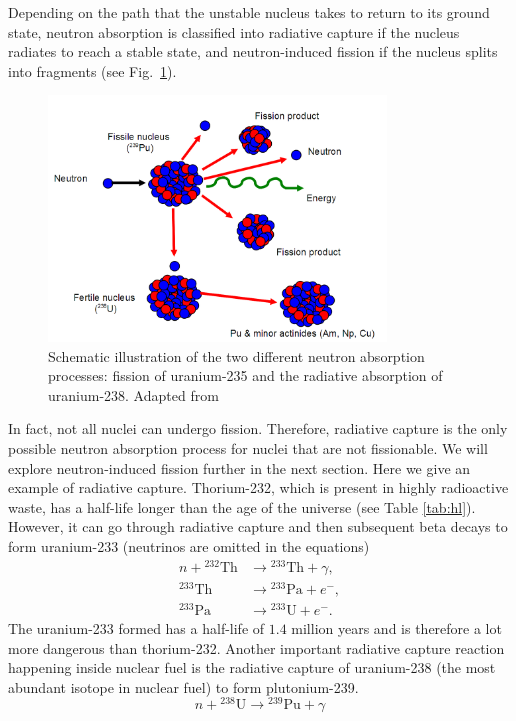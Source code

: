 \documentclass[nofootinbib,preprint,aps]{revtex4-1}
\begin{document}
    Depending on the path that the unstable nucleus takes to return to its ground
    state, neutron absorption is classified into radiative capture if the nucleus radiates to reach a stable
    state, and neutron-induced fission if the nucleus splits into fragments (see Fig.~\ref{fig:both}).
        \begin{figure}[h]
            \centering
            \includegraphics[width=0.8\textwidth]{pu.png}
            \caption{Schematic illustration of the two different neutron absorption processes:
            fission of uranium-235 and the radiative absorption of uranium-238. Adapted from \cite{iync_2013}}
            \label{fig:both}
        \end{figure}
    In fact, not all nuclei can undergo fission.
    Therefore, radiative capture is the only possible neutron absorption process for
    nuclei that are not fissionable.\cite{lb01}
    We will explore neutron-induced fission further in the next section. Here we give an example of radiative capture. Thorium-232, which is present in highly radioactive
    waste, has a half-life longer than the age of the universe (see Table \ref{tab:hl}). However, it can go through
    radiative capture and then subsequent beta decays to form uranium-233 (neutrinos are omitted in the equations)
    \begin{align}
        n + {}^{232}\text{Th} &\rightarrow {}^{233}\text{Th} + \gamma,\\
        {}^{233}\text{Th} &\rightarrow {}^{233}\text{Pa} + e^-,\\
        {}^{233}\text{Pa} &\rightarrow {}^{233}\text{U} + e^-.
    \end{align}
    The uranium-233 formed has a half-life of $1.4$ million years and is therefore a lot more dangerous than
    thorium-232. Another important radiative capture reaction happening inside nuclear fuel is the radiative
    capture of uranium-238 (the most abundant isotope in nuclear fuel) to form plutonium-239.
    \begin{equation}
        n + {}^{238}\text{U} \rightarrow {}^{239}\text{Pu} + \gamma
    \end{equation}
\end{document}
